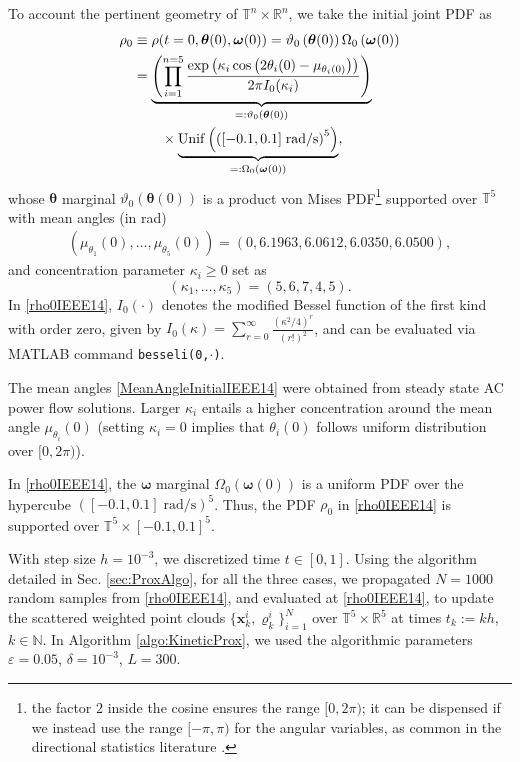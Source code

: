 \documentclass[10pt,twocolumn]{IEEEtran}
\begin{document}
To account the pertinent geometry of $\mathbb{T}^{n}\times\mathbb{R}^{n}$, we take the initial joint PDF as
\begin{align}
\rho_{0}&\equiv\rho(t=0,\bm{\theta}(0),\bm{\omega}(0)) = \vartheta_{0}\left(\bm{\theta}(0)\right)\Omega_{0}\left(\bm{\omega}(0)\right)\nonumber\\
&=\underbrace{\left(\prod_{i=1}^{n=5}\dfrac{\exp\left(\kappa_{i}\cos\left(2\theta_{i}(0)-\mu_{\theta_{i}(0)}\right)\right)}{2\pi I_{0}(\kappa_{i})}\right)}_{=:\vartheta_{0}\left(\bm{\theta}(0)\right)}\nonumber\\
	&\qquad\times \underbrace{{\rm{Unif}}\left(\left([-0.1,0.1]\;\text{rad/s}\right)^{5}\right)}_{=:\Omega_{0}\left(\bm{\omega}(0)\right)},
\label{rho0IEEE14}		
\end{align}
whose $\bm{\theta}$ marginal $ \vartheta_{0}\left(\bm{\theta}(0)\right)$ is a product von Mises PDF\footnote{the factor $2$ inside the cosine ensures the range $[0,2\pi)$; it can be dispensed if we instead use the range $[-\pi,\pi)$ for the angular variables, as common in the directional statistics literature \cite{mardia2009directional}.} \cite{mardia2008multivariate,mardia2014some} supported over $\mathbb{T}^{5}$ with mean angles (in rad)
\begin{align}
\left(\mu_{\theta_{1}}(0),\hdots,\mu_{\theta_{5}}(0)\right)=\left(0, 6.1963, 6.0612, 6.0350, 6.0500\right),
\label{MeanAngleInitialIEEE14}	
\end{align}
and concentration parameter $\kappa_{i}\geq 0$ set as 
\[(\kappa_{1},\hdots,\kappa_5) = \left(5,6,7,4,5\right).\]
In \eqref{rho0IEEE14}, $I_{0}(\cdot)$ denotes the modified Bessel function of the first kind with order zero, given by $I_{0}(\kappa) = \sum_{r=0}^{\infty} \frac{\left(\kappa^{2}/4\right)^{r}}{(r!)^{2}}$, and can be evaluated via MATLAB command \texttt{besseli(0,$\cdot$)}. 

The mean angles \eqref{MeanAngleInitialIEEE14} were obtained from steady state AC power flow solutions. Larger $\kappa_{i}$ entails a higher concentration around the mean angle $\mu_{\theta_{i}}(0)$ (setting $\kappa_i=0$ implies that $\theta_{i}(0)$ follows uniform distribution over $[0,2\pi)$).

In \eqref{rho0IEEE14}, the $\bm{\omega}$ marginal $ \Omega_{0}\left(\bm{\omega}(0)\right)$ is a uniform PDF over the hypercube $\left([-0.1,0.1]\;\text{rad/s}\right)^{5}$. Thus, the PDF $\rho_0$ in \eqref{rho0IEEE14} is supported over $\mathbb{T}^{5}\times [-0.1,0.1]^{5}$.

With step size $h=10^{-3}$, we discretized time $t\in[0,1]$. Using the algorithm detailed in Sec. \ref{sec:ProxAlgo}, for all the three cases, we propagated $N=1000$ random samples from \eqref{rho0IEEE14}, and evaluated at \eqref{rho0IEEE14}, to update the scattered weighted point clouds $\{\bm{x}_{k}^{i},\varrho_{k}^{i}\}_{i=1}^{N}$ over $\mathbb{T}^{5}\times\mathbb{R}^{5}$ at times $t_{k}:=kh$, $k\in\mathbb{N}$. In Algorithm \ref{algo:KineticProx}, we used the algorithmic parameters $\varepsilon=0.05$, $\delta=10^{-3}$, $L=300$.
\end{document}
